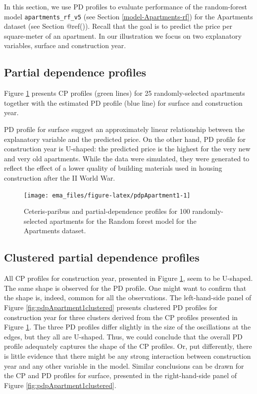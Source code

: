 \documentclass[]{krantz}
\begin{document}
In this section, we use PD profiles to evaluate performance of the random-forest model \texttt{apartments\_rf\_v5} (see Section \ref{model-Apartments-rf}) for the Apartments dataset (see Section @ref()). Recall that the goal is to predict the price per square-meter of an apartment. In our illustration we focus on two explanatory variables, surface and construction year.

\hypertarget{partial-dependence-profiles}{%
\subsection{Partial dependence profiles}\label{partial-dependence-profiles}}

Figure \ref{fig:pdpApartment1} presents CP profiles (green lines) for 25 randomly-selected apartments together with the estimated PD profile (blue line) for surface and construction year.

PD profile for surface suggest an approximately linear relationship between the explanatory variable and the predicted price. On the other hand, PD profile for construction year is U-shaped: the predicted price is the highest for the very new and very old apartments. While the data were simulated, they were generated to reflect the effect of a lower quality of building materials used in housing construction after the II World War.

\begin{figure}

{\centering \texttt{[image: ema\_files/figure-latex/pdpApartment1-1]} 

}

\caption{Ceteris-paribus and partial-dependence profiles for 100 randomly-selected apartments for the Random forest model for the Apartments dataset.}\label{fig:pdpApartment1}
\end{figure}

\hypertarget{clustered-partial-dependence-profiles}{%
\subsection{Clustered partial dependence profiles}\label{clustered-partial-dependence-profiles}}

All CP profiles for construction year, presented in Figure \ref{fig:pdpApartment1}, seem to be U-shaped. The same shape is observed for the PD profile. One might want to confirm that the shape is, indeed, common for all the observations. The left-hand-side panel of Figure \ref{fig:pdpApartment1clustered} presents clustered PD profiles for construction year for three clusters derived from the CP profiles presented in Figure \ref{fig:pdpApartment1}. The three PD profiles differ slightly in the size of the oscillations at the edges, but they all are U-shaped. Thus, we could conclude that the overall PD profile adequately captures the shape of the CP profiles. Or, put differently, there is little evidence that there might be any strong interaction between construction year and any other variable in the model. Similar conclusions can be drawn for the CP and PD profiles for surface, presented in the right-hand-side panel of Figure \ref{fig:pdpApartment1clustered}.
\end{document}
